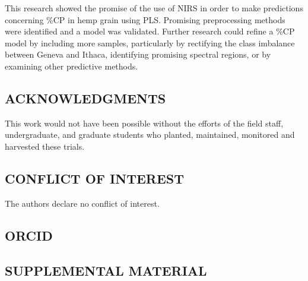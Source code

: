 \documentclass[
]{agujournal2019}
\begin{document}
This research showed the promise of the use of NIRS in order to make
predictions concerning \%CP in hemp grain using PLS. Promising
preprocessing methods were identified and a model was validated. Further
research could refine a \%CP model by including more samples,
particularly by rectifying the class imbalance between Geneva and
Ithaca, identifying promising spectral regions, or by examining other
predictive methods.

\subsection{ACKNOWLEDGMENTS}\label{acknowledgments}

This work would not have been possible without the efforts of the field
staff, undergraduate, and graduate students who planted, maintained,
monitored and harvested these trials.

\subsection{CONFLICT OF INTEREST}\label{conflict-of-interest}

The authors declare no conflict of interest.

\subsection{ORCID}\label{orcid}

\subsection{SUPPLEMENTAL MATERIAL}\label{supplemental-material}
\end{document}
